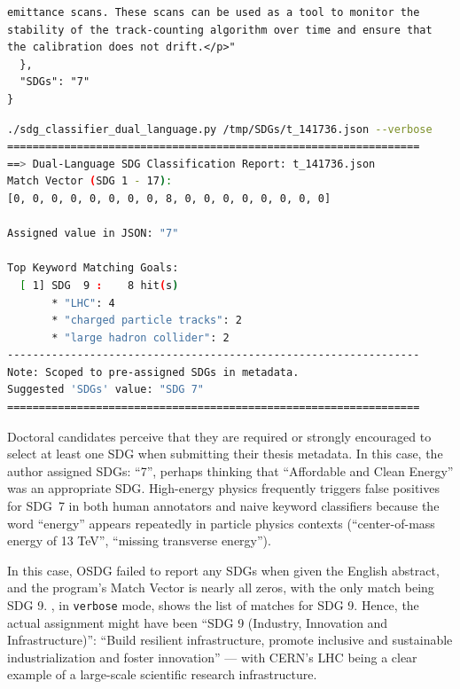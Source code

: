 \begin{casestudySection}
\begin{lstlisting}
emittance scans. These scans can be used as a tool to monitor the stability of the track-counting algorithm over time and ensure that the calibration does not drift.</p>"
  },
  "SDGs": "7"
}
\end{lstlisting}

\begin{lstlisting}[language={bash}, basicstyle=\footnotesize, escapechar=|, breaklines=true,
    postbreak=\usebox{\lstbreakbox}, caption={Program's output}, label=lst:t_141736Output]
 ./sdg_classifier_dual_language.py /tmp/SDGs/t_141736.json --verbose
=================================================================
==> Dual-Language SDG Classification Report: t_141736.json
Match Vector (SDG 1 - 17):
[0, 0, 0, 0, 0, 0, 0, 0, 8, 0, 0, 0, 0, 0, 0, 0, 0]

Assigned value in JSON: "7"

Top Keyword Matching Goals:
  [ 1] SDG  9 :    8 hit(s)
       * "LHC": 4
       * "charged particle tracks": 2
       * "large hadron collider": 2
-----------------------------------------------------------------
Note: Scoped to pre-assigned SDGs in metadata.
Suggested 'SDGs' value: "SDG 7"
=================================================================
\end{lstlisting}

Doctoral candidates perceive that they are required or strongly encouraged to select at least one \gls{SDG} when submitting their thesis metadata. In this case, the author assigned \glspl{SDG}: \enquote{7}, perhaps thinking that \enquote{Affordable and Clean Energy} was an appropriate \gls{SDG}. High-energy physics frequently triggers false positives for \gls{SDG}~7 in both human annotators and naive keyword classifiers because the word \enquote{energy} appears repeatedly in particle physics contexts (\eg \enquote{center-of-mass energy of 13 TeV}, \enquote{missing transverse energy}).

In this case, OSDG failed to report any \glspl{SDG} when given the English abstract, and the program's Match Vector is nearly all zeros, with the only match being \gls{SDG} 9. , in \texttt{verbose} mode, shows the list of matches for \gls{SDG} 9. Hence, the actual assignment might have been \enquote{SDG 9 (Industry, Innovation and Infrastructure)}: \enquote{Build resilient infrastructure, promote inclusive and sustainable industrialization and foster innovation} --- with \gls{CERN}'s \gls{LHC} being a clear example of a large-scale scientific research infrastructure.


\end{casestudySection}
